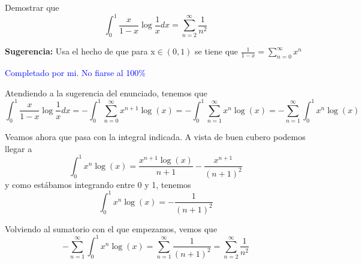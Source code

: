 \begin{problem}[19]
Demostrar que
\[\int_0^1\frac{x}{1-x}\log\frac{1}{x}dx = \sum_{n=2}^{\infty}\frac{1}{n^2}\]

\textbf{Sugerencia:} Usa el hecho de que para x$\in(0,1)$ se tiene que $\frac{1}{1-x}=\sum_{n=0}^{\infty}x^n$

\solution
\textcolor{blue}{Completado por mi. No fiarse al 100\%}

Atendiendo a la sugerencia del enunciado, tenemos que
\[\int_0^1\frac{x}{1-x}\log\frac{1}{x}dx = -\int_0^1\sum_{n=0}^{\infty}x^{n+1}\log(x) = -\int_0^1 \sum_{n=1}^{\infty}x^n\log(x) =  -\sum_{n=1}^{\infty}\int_0^1 x^n\log(x)\]

Veamos ahora que pasa con la integral indicada. A vista de buen cubero podemos llegar a
\[\int_0^1x^n\log(x)=\frac{x^{n+1}\log(x)}{n+1}-\frac{x^{n+1}}{(n+1)^2}\]
y como estábamos integrando entre 0 y 1, tenemos
\[\int_0^1x^n\log(x)=-\frac{1}{(n+1)^2}\]

Volviendo al sumatorio con el que empezamos, vemos que
\[-\sum_{n=1}^{\infty}\int_0^1 x^n\log(x) = \sum_{n=1}^{\infty}\frac{1}{(n+1)^2} = \sum_{n=2}^{\infty}\frac{1}{n^2}\]
\end{problem}

